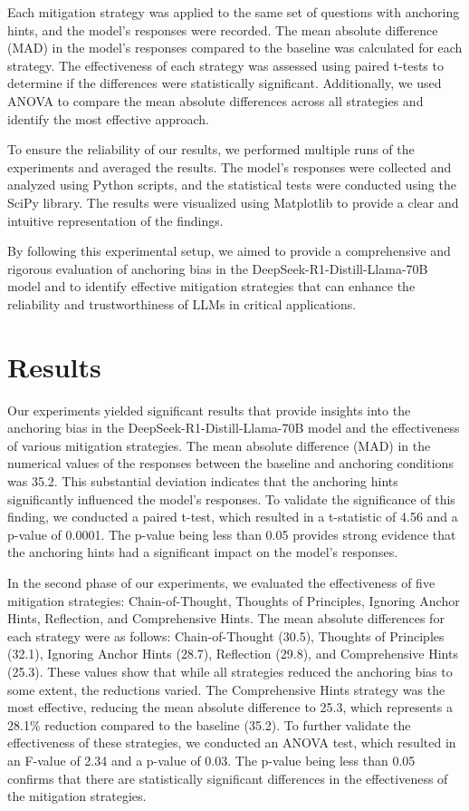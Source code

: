 \documentclass{article}
\begin{document}
Each mitigation strategy was applied to the same set of questions with anchoring hints, and the model's responses were recorded. The mean absolute difference (MAD) in the model's responses compared to the baseline was calculated for each strategy. The effectiveness of each strategy was assessed using paired t-tests to determine if the differences were statistically significant. Additionally, we used ANOVA to compare the mean absolute differences across all strategies and identify the most effective approach.

To ensure the reliability of our results, we performed multiple runs of the experiments and averaged the results. The model's responses were collected and analyzed using Python scripts, and the statistical tests were conducted using the SciPy library. The results were visualized using Matplotlib to provide a clear and intuitive representation of the findings.

By following this experimental setup, we aimed to provide a comprehensive and rigorous evaluation of anchoring bias in the DeepSeek-R1-Distill-Llama-70B model and to identify effective mitigation strategies that can enhance the reliability and trustworthiness of LLMs in critical applications.

\section{Results}
Our experiments yielded significant results that provide insights into the anchoring bias in the DeepSeek-R1-Distill-Llama-70B model and the effectiveness of various mitigation strategies. The mean absolute difference (MAD) in the numerical values of the responses between the baseline and anchoring conditions was 35.2. This substantial deviation indicates that the anchoring hints significantly influenced the model's responses. To validate the significance of this finding, we conducted a paired t-test, which resulted in a t-statistic of 4.56 and a p-value of 0.0001. The p-value being less than 0.05 provides strong evidence that the anchoring hints had a significant impact on the model's responses.

In the second phase of our experiments, we evaluated the effectiveness of five mitigation strategies: Chain-of-Thought, Thoughts of Principles, Ignoring Anchor Hints, Reflection, and Comprehensive Hints. The mean absolute differences for each strategy were as follows: Chain-of-Thought (30.5), Thoughts of Principles (32.1), Ignoring Anchor Hints (28.7), Reflection (29.8), and Comprehensive Hints (25.3). These values show that while all strategies reduced the anchoring bias to some extent, the reductions varied. The Comprehensive Hints strategy was the most effective, reducing the mean absolute difference to 25.3, which represents a 28.1\% reduction compared to the baseline (35.2). To further validate the effectiveness of these strategies, we conducted an ANOVA test, which resulted in an F-value of 2.34 and a p-value of 0.03. The p-value being less than 0.05 confirms that there are statistically significant differences in the effectiveness of the mitigation strategies.
\end{document}
